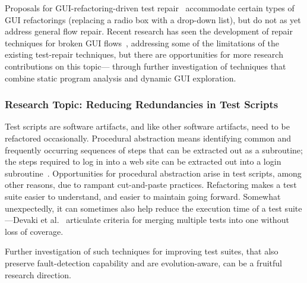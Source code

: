 
Proposals for GUI-refactoring-driven test repair~\cite{Daniel2011} accommodate
certain types of GUI refactorings (\eg replacing a radio box with a drop-down
list), but do not as yet address general flow repair.  Recent research has seen
the development of repair techniques for broken GUI flows~\cite{Zhang2013},
addressing some of the limitations of the existing test-repair techniques, but
there are opportunities for more research contributions on this topic---\eg
through further investigation of techniques that combine static program analysis
and dynamic GUI exploration.

\subsubsection*{Research Topic: Reducing Redundancies in Test Scripts}

Test scripts are software artifacts, and like other software artifacts, need to
be refactored occasionally.  Procedural abstraction means identifying common and
frequently occurring sequences of steps that can be extracted out as a
subroutine; \eg the steps required to log in into a web site can be extracted
out into a login subroutine~\cite{Mahmud:2010}.  Opportunities for procedural
abstraction arise in test scripts, among other reasons, due to rampant
cut-and-paste practices.  Refactoring makes a test suite easier to understand,
and easier to maintain going forward.  Somewhat unexpectedly, it can sometimes
also help reduce the execution time of a test suite---\eg Devaki et
al.~\cite{Devaki:2013} articulate criteria for merging multiple tests into one
without loss of coverage.

Further investigation of such techniques for improving test suites, that also
preserve fault-detection capability and are evolution-aware, can be a fruitful
research direction.

